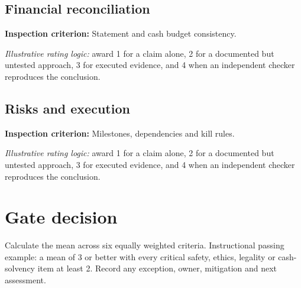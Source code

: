 \documentclass[11pt]{article}
\begin{document}
\subsection*{Financial reconciliation}
\textbf{Inspection criterion:} Statement and cash budget consistency.\par\textit{Illustrative rating logic:} award 1 for a claim alone, 2 for a documented but untested approach, 3 for executed evidence, and 4 when an independent checker reproduces the conclusion.\par
\subsection*{Risks and execution}
\textbf{Inspection criterion:} Milestones, dependencies and kill rules.\par\textit{Illustrative rating logic:} award 1 for a claim alone, 2 for a documented but untested approach, 3 for executed evidence, and 4 when an independent checker reproduces the conclusion.\par
\section{Gate decision}
Calculate the mean across six equally weighted criteria. Instructional passing example: a mean of 3 or better with every critical safety, ethics, legality or cash-solvency item at least 2. Record any exception, owner, mitigation and next assessment.
\end{document}
